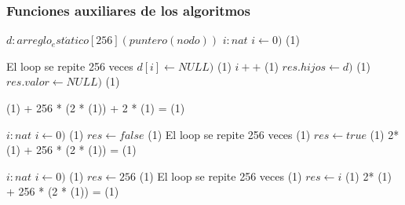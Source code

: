 





\subsubsection{Funciones auxiliares de los algoritmos}

  {
    \var $d : arreglo_est\acute{a}tico[256] (puntero(nodo))$
    \var $i : nat$
    \State $i \gets 0)$                									\comment \bigo(1)

     	\Statex             \comment El loop se repite 256 veces
     	\State $d[i] \gets NULL)$										\comment \bigo(1)
     	\State $i++$   													\comment \bigo(1) 
    \EndWhile						
    \State $res.hijos \gets d)$											\comment \bigo(1) 
    \State $res.valor \gets NULL)$   									\comment \bigo(1) 
}{   \bigo(1) + 256 * (2 * \bigo(1)) + 2 * \bigo(1) = \bigo(1) }

  {
    \var $i : nat$
    \State $i \gets 0)$                									\comment \bigo(1)
    \State $res \gets false$										\comment \bigo(1)
     	\Statex             \comment El loop se repite 256 veces
 		                     			\comment \bigo(1)
		 	\State $res \gets true$										\comment \bigo(1)
     	 \EndIf	 													 
    \EndWhile						
}{  2* \bigo(1) + 256 * (2 * \bigo(1))  = \bigo(1) }

  {
    \var $i : nat$
    \State $i \gets 0)$                									\comment \bigo(1)
    \State $res \gets 256$												\comment \bigo(1)
     	\Statex             \comment El loop se repite 256 veces
 		                     			\comment \bigo(1)
		 	\State $res \gets i$										\comment \bigo(1)
     	 \EndIf	 													 
    \EndWhile						
}{  2* \bigo(1) + 256 * (2 * \bigo(1))  = \bigo(1) }


